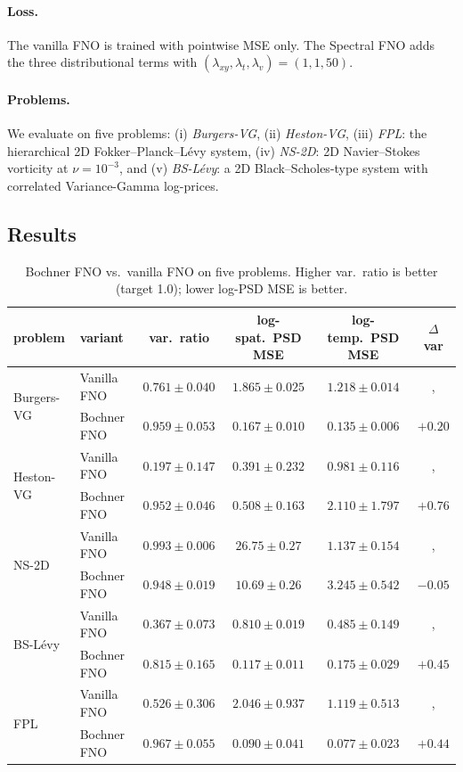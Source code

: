 \documentclass[10pt]{elsarticle}
\begin{document}
\paragraph{Loss.}
The vanilla FNO is trained with pointwise MSE only. The Spectral
FNO adds the three distributional terms with
$(\lambda_{xy}, \lambda_{t}, \lambda_{v}) = (1, 1, 50)$.

\paragraph{Problems.}
We evaluate on five problems:
(i) \emph{Burgers-VG}, (ii) \emph{Heston-VG},
(iii) \emph{FPL}: the hierarchical 2D Fokker--Planck--L\'evy system,
(iv) \emph{NS-2D}: 2D Navier--Stokes vorticity at $\nu = 10^{-3}$,
and (v) \emph{BS-L\'evy}: a 2D Black--Scholes-type system with
correlated Variance-Gamma log-prices.

\subsection{Results}
\label{subsec:fno-results}

\begin{table}[h]
\centering
\caption{Bochner FNO vs.\ vanilla FNO on five problems. Higher
var.\ ratio is better (target 1.0); lower log-PSD MSE is better.}
\label{tab:spectral-fno}
\begin{tabular}{l l c c c c}
\toprule
problem & variant & var.\ ratio & log-spat.\ PSD MSE & log-temp.\ PSD MSE & $\Delta$ var \\
\midrule
\multirow{2}{*}{Burgers-VG} &
 Vanilla FNO & $0.761 \pm 0.040$ & $1.865 \pm 0.025$ & $1.218 \pm 0.014$ &, \\
& Bochner FNO & $\mathbf{0.959 \pm 0.053}$ & $\mathbf{0.167 \pm 0.010}$ & $\mathbf{0.135 \pm 0.006}$ & $+0.20$ \\
\midrule
\multirow{2}{*}{Heston-VG} &
 Vanilla FNO & $0.197 \pm 0.147$ & $0.391 \pm 0.232$ & $0.981 \pm 0.116$ &, \\
& Bochner FNO & $\mathbf{0.952 \pm 0.046}$ & $0.508 \pm 0.163$ & $2.110 \pm 1.797$ & $\mathbf{+0.76}$ \\
\midrule
\multirow{2}{*}{NS-2D}   &
 Vanilla FNO & $\mathbf{0.993 \pm 0.006}$ & $26.75 \pm 0.27$ & $1.137 \pm 0.154$ &, \\
& Bochner FNO & $0.948 \pm 0.019$ & $\mathbf{10.69 \pm 0.26}$ & $3.245 \pm 0.542$ & $-0.05$ \\
\midrule
\multirow{2}{*}{BS-L\'evy} &
 Vanilla FNO & $0.367 \pm 0.073$ & $0.810 \pm 0.019$ & $0.485 \pm 0.149$ &, \\
& Bochner FNO & $\mathbf{0.815 \pm 0.165}$ & $\mathbf{0.117 \pm 0.011}$ & $\mathbf{0.175 \pm 0.029}$ & $+0.45$ \\
\midrule
\multirow{2}{*}{FPL}    &
 Vanilla FNO & $0.526 \pm 0.306$ & $2.046 \pm 0.937$ & $1.119 \pm 0.513$ &, \\
& Bochner FNO & $\mathbf{0.967 \pm 0.055}$ & $\mathbf{0.090 \pm 0.041}$ & $\mathbf{0.077 \pm 0.023}$ & $+0.44$ \\
\bottomrule
\end{tabular}
\end{table}
\end{document}
